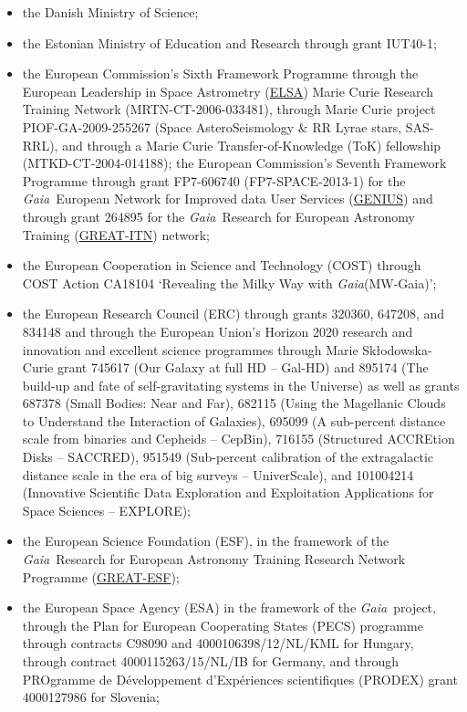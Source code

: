 \documentclass{aa}
\newcommand{\gaia}{\textit{Gaia}\xspace}
\begin{document}
\begin{appendix}
\begin{itemize}
\item the Danish Ministry of Science;
\item the Estonian Ministry of Education and Research through grant IUT40-1;
\item the European Commission’s Sixth Framework Programme through the European Leadership in Space Astrometry (\href{https://www.cosmos.esa.int/web/gaia/elsa-rtn-programme}{ELSA}) Marie Curie Research Training Network (MRTN-CT-2006-033481), through Marie Curie project PIOF-GA-2009-255267 (Space AsteroSeismology \& RR Lyrae stars, SAS-RRL), and through a Marie Curie Transfer-of-Knowledge (ToK) fellowship (MTKD-CT-2004-014188); the European Commission's Seventh Framework Programme through grant FP7-606740 (FP7-SPACE-2013-1) for the \gaia\ European Network for Improved data User Services (\href{https://gaia.ub.edu/twiki/do/view/GENIUS/}{GENIUS}) and through grant 264895 for the \gaia\ Research for European Astronomy Training (\href{https://www.cosmos.esa.int/web/gaia/great-programme}{GREAT-ITN}) network;
\item the European Cooperation in Science and Technology (COST) through COST Action CA18104 `Revealing the Milky Way with \gaia (MW-Gaia)';
\item the European Research Council (ERC) through grants 320360, 647208, and 834148 and through the European Union’s Horizon 2020 research and innovation and excellent science programmes through Marie Sk{\l}odowska-Curie grant 745617 (Our Galaxy at full HD -- Gal-HD) and 895174 (The build-up and fate of self-gravitating systems in the Universe) as well as grants 687378 (Small Bodies: Near and Far), 682115 (Using the Magellanic Clouds to Understand the Interaction of Galaxies), 695099 (A sub-percent distance scale from binaries and Cepheids -- CepBin), 716155 (Structured ACCREtion Disks -- SACCRED), 951549 (Sub-percent calibration of the extragalactic distance scale in the era of big surveys -- UniverScale), and 101004214 (Innovative Scientific Data Exploration and Exploitation Applications for Space Sciences -- EXPLORE);
\item the European Science Foundation (ESF), in the framework of the \gaia\ Research for European Astronomy Training Research Network Programme (\href{https://www.cosmos.esa.int/web/gaia/great-programme}{GREAT-ESF});
\item the European Space Agency (ESA) in the framework of the \gaia\ project, through the Plan for European Cooperating States (PECS) programme through contracts C98090 and 4000106398/12/NL/KML for Hungary, through contract 4000115263/15/NL/IB for Germany, and through PROgramme de D\'{e}veloppement d'Exp\'{e}riences scientifiques (PRODEX) grant 4000127986 for Slovenia;  

\end{itemize}
\end{appendix}
\end{document}
